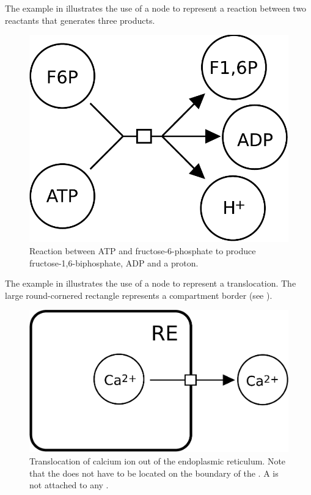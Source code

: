 The example in  illustrates the use of a  node to represent a reaction between two reactants that generates three products. 

\begin{figure}[H]
  \centering
  \includegraphics[scale = 0.3]{examples/process-reaction}
  \caption{Reaction between ATP and fructose-6-phosphate to produce fructose-1,6-biphosphate, ADP and a proton.}
  \label{fig:trans-react}
\end{figure}

The example in  illustrates the use of a  node to represent a translocation. The large round-cornered rectangle represents a compartment border (see ).

\begin{figure}[H]
  \centering
  \includegraphics[scale = 0.3]{examples/process-translocation}
  \caption{Translocation of calcium ion out of the endoplasmic reticulum. Note that the  does not have to be located on the boundary of the . A  is not attached to any .}
  \label{fig:trans-trans}
\end{figure}

